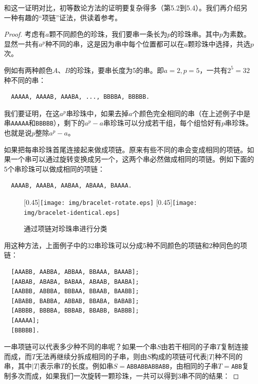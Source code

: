 \documentclass{article}
\begin{document}
和这一证明对比，初等数论方法的证明要复杂得多（\cite{StepanovRose15}第5.2到5.4）。我们再介绍另一种有趣的“项链”证法\cite{Wiki-FLT-proof}，供读着参考。

\begin{proof}
考虑有$a$颗不同颜色的珍珠，我们要串一条长为$p$的珍珠串。其中$p$为素数。显然一共有$a^p$种不同的串，这是因为串中每个位置都可以在$a$颗珍珠中选择，共选$p$次。

例如有两种颜色$A$、$B$的珍珠，要串长度为5的串。即$a = 2, p = 5$，一共有$2^5 = 32$种不同的串：

\begin{verbatim}
  AAAAA, AAAAB, AAABA, ..., BBBBA, BBBBB.
\end{verbatim}

我们要证明，在这$a^p$串珍珠中，如果去掉$a$个颜色完全相同的串（在上述例子中是串\texttt{AAAAA}和\texttt{BBBBB}），剩下的$a^p - a$串珍珠可以分成若干组，每个组恰好有$p$串珍珠。也就是说$p$整除$a^p - a$。

如果把每串珍珠首尾连接起来做成项链。原来有些不同的串会变成相同的项链。如果一个串可以通过旋转变换成另一个，这两个串必然做成相同的项链。例如下面的5个串珍珠可以做成相同的项链：

\begin{verbatim}
  AAAAB, AAABA, AABAA, ABAAA, BAAAA.
\end{verbatim}

\begin{figure}[htbp]
  \centering
  [0.45\linewidth]{\texttt{[image: img/bracelet-rotate.eps]}} \quad
  [0.45\linewidth]{\texttt{[image: img/bracelet-identical.eps]}}
  \caption{通过项链对珍珠串进行分类}
  \label{fig:bracelet}
\end{figure}

用这种方法，上面例子中的32串珍珠可以分成5种不同颜色的项链和2种同色的项链：

\begin{verbatim}
  [AAABB, AABBA, ABBAA, BBAAA, BAAAB];
  [AABAB, ABABA, BABAA, ABAAB, BAABA];
  [AABBB, ABBBA, BBBAA, BBAAB, BAABB];
  [ABABB, BABBA, ABBAB, BBABA, BABAB];
  [ABBBB, BBBBA, BBBAB, BBABB, BABBB];
  [AAAAA];
  [BBBBB].
\end{verbatim}

一串项链可以代表多少种不同的串呢？如果一个串$S$由若干相同的子串$T$复制连接而成，而$T$无法再继续分拆成相同的子串，则由$S$构成的项链可代表$|T|$种不同的串，其中$|T|$表示串$T$的长度。例如串$S=$\texttt{ABBABBABBABB}，由相同的子串$T=$\texttt{ABB}复制多次而成，如果我们一次旋转一颗珍珠，一共可以得到3串不同的结果：


\end{proof}
\end{document}
